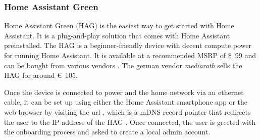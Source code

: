 \subsubsection{Home Assistant Green}
Home Assistant Green (HAG) is the easiest way to get started with Home Assistant. It is a plug-and-play solution that comes with Home Assistant preinstalled. The HAG is a beginner-friendly device with decent compute power for running Home Assistant. It is available at a recommended MSRP of \$~99 and can be bought from various vendors \cite{HomeAssistant_HAG}. The german vendor \textit{mediarath} \cite{mediarath_HAG} sells the HAG for around €~105.

Once the device is connected to power and the home network via an ethernet cable, it can be set up using either the Home Assistant smartphone app or the web browser by visiting the url , which is a mDNS record pointer that redirects the user to the IP address of the HAG \cite{HomeAssistant_HAG}. Once connected, the user is greeted with the onboarding process and asked to create a local admin account.

